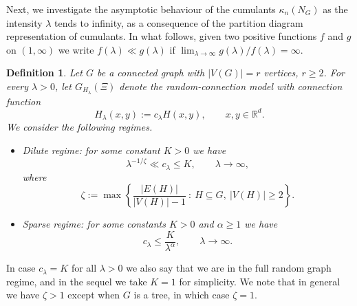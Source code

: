 \documentclass[12pt]{article}
\newcommand{\R}{\mathbb{R}}
\newtheorem{definition}[prop]{Definition}
\def\real{{\mathord{\mathbb R}}}
\numberwithin{equation}{section}
\begin{document}
 
\noindent
 Next, we investigate the asymptotic behaviour of the cumulants $\kappa_n(N_G)$
as the intensity $\lambda$ tends to infinity, as a consequence of the partition diagram representation of cumulants. 
In what follows, given two positive functions $f$ and $g$ on $(1,\infty )$ we write
$f(\lambda ) \ll g(\lambda )$ if 
$\lim_{\lambda \to \infty} g(\lambda ) / f(\lambda ) = \infty$.
\begin{definition}
  Let $G$ be a connected graph with $|V(G)| = r$ vertices, $r\geq 2$.
  For every $\lambda >0$,
  let $G_{H_\lambda} (\Xi)$
  denote the random-connection model
  with connection function 
  $$
  H_\lambda(x,y):= c_\lambda H(x,y), \qquad x,y \in \real^d.
  $$ 
  We consider the following regimes.
\begin{itemize}
\item Dilute regime: for some constant $K>0$ we have 
\begin{equation}
    \label{fjnldsf}
    \lambda^{-1/\zeta} \ll c_\lambda \leq K,
    \qquad
    \lambda\to \infty,
\end{equation}
 where
 \begin{equation}
   \label{fjkldf}
   \zeta:=\max\left\{\frac{|E(H)|}{|V(H)|-1} \ \! : \ \!
   H\subseteq G, \ \! |V(H)| \geq 2 \right\}.
   \end{equation} 
\item Sparse regime: for some constants $K>0$ and $\alpha \geq 1$ we have
  \begin{equation}
    \label{fjnldsf-2}
    c_\lambda \leq \frac{K}{\lambda^\alpha},
        \qquad
    \lambda\to \infty. 
    \end{equation} %
\end{itemize} 
\end{definition}
In case $c_\lambda = K$ for all $\lambda > 0$
we also say that we are in the full random graph regime,
and in the sequel we take $K=1$ for simplicity.
We note that in general we have $\zeta > 1$ except when $G$ is a tree,
in which case $\zeta = 1$. 
\noindent
\end{document}
